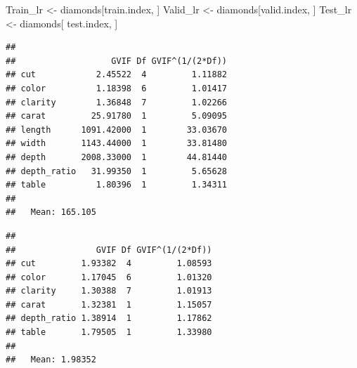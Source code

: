 \documentclass[
]{article}
\newenvironment{Shaded}{\begin{snugshade}}{\end{snugshade}}
\newcommand{\AttributeTok}[1]{\textcolor[rgb]{0.77,0.63,0.00}{#1}}
\newcommand{\DecValTok}[1]{\textcolor[rgb]{0.00,0.00,0.81}{#1}}
\newcommand{\FunctionTok}[1]{\textcolor[rgb]{0.00,0.00,0.00}{#1}}
\newcommand{\NormalTok}[1]{#1}
\newcommand{\OtherTok}[1]{\textcolor[rgb]{0.56,0.35,0.01}{#1}}
\newcommand{\SpecialCharTok}[1]{\textcolor[rgb]{0.00,0.00,0.00}{#1}}
\begin{document}
\begin{Shaded}
\begin{Highlighting}[]
\NormalTok{Train\_lr }\OtherTok{\textless{}{-}}\NormalTok{ diamonds[train.index, ]}
\NormalTok{Valid\_lr }\OtherTok{\textless{}{-}}\NormalTok{ diamonds[valid.index, ]}
\NormalTok{Test\_lr  }\OtherTok{\textless{}{-}}\NormalTok{ diamonds[ test.index, ]}
\end{Highlighting}
\end{Shaded}

\begin{Shaded}
\end{Shaded}

\begin{verbatim}
##
##                   GVIF Df GVIF^(1/(2*Df))
## cut            2.45522  4         1.11882
## color          1.18398  6         1.01417
## clarity        1.36848  7         1.02266
## carat         25.91780  1         5.09095
## length      1091.42000  1        33.03670
## width       1143.44000  1        33.81480
## depth       2008.33000  1        44.81440
## depth_ratio   31.99350  1         5.65628
## table          1.80396  1         1.34311
##
##   Mean: 165.105
\end{verbatim}

\begin{Shaded}
\end{Shaded}

\begin{verbatim}
##
##                GVIF Df GVIF^(1/(2*Df))
## cut         1.93382  4         1.08593
## color       1.17045  6         1.01320
## clarity     1.30388  7         1.01913
## carat       1.32381  1         1.15057
## depth_ratio 1.38914  1         1.17862
## table       1.79505  1         1.33980
##
##   Mean: 1.98352
\end{verbatim}
\end{document}
